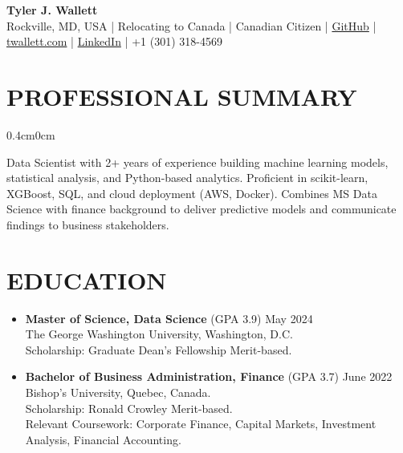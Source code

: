 \documentclass[a4paper,9pt]{extarticle}
\begin{document}
\thispagestyle{firstpage}

\begin{center}
\textbf{\Huge Tyler J. Wallett }\\[3pt] %
Rockville, MD, USA | Relocating to Canada | Canadian Citizen | \href{https://github.com/twallett}{GitHub} | \href{https://www.twallett.com}{twallett.com} | \href{https://www.linkedin.com/in/twallett/}{LinkedIn} | +1 (301) 318-4569  %
\end{center}

\section*{PROFESSIONAL SUMMARY}

\begin{adjustwidth}{0.4cm}{0cm}

Data Scientist with 2+ years of experience building machine learning models, statistical analysis, and Python-based analytics. Proficient in scikit-learn, XGBoost, SQL, and cloud deployment (AWS, Docker). Combines MS Data Science with finance background to deliver predictive models and communicate findings to business stakeholders.

\end{adjustwidth}

\section*{EDUCATION}

\begin{itemize}[leftmargin=0.4cm, label={}]
    \item \textbf{Master of Science, Data Science} (GPA 3.9) \hfill May 2024 \\ 
    The George Washington University, Washington, D.C. \\ 
    Scholarship: Graduate Dean's Fellowship Merit-based.
\end{itemize}

\noindent
\begin{itemize}[leftmargin=0.4cm, label={}]
    \item \textbf{Bachelor of Business Administration, Finance} (GPA 3.7) \hfill June 2022 \\
    Bishop's University, Quebec, Canada. \\ 
    Scholarship: Ronald Crowley Merit-based. \\
    Relevant Coursework: Corporate Finance, Capital Markets, Investment Analysis, Financial Accounting.
\end{itemize}
\end{document}
